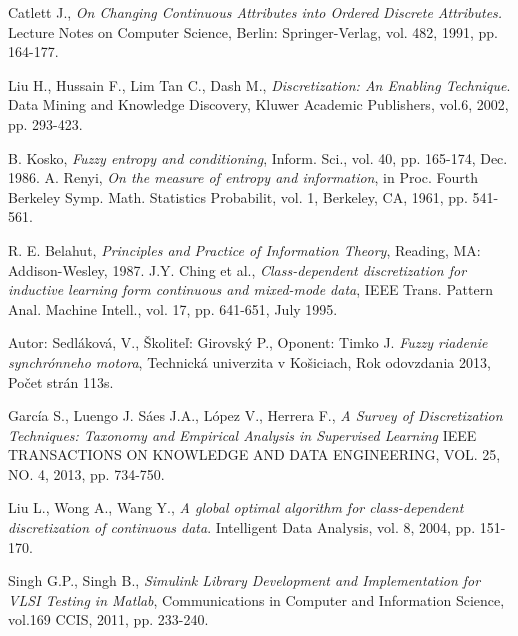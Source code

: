 \begin{thebibliography}{}
 Catlett J., \textit{On Changing Continuous Attributes into Ordered Discrete Attributes.} Lecture Notes on Computer Science, Berlin: Springer-Verlag, vol. 482, 1991, pp. 164-177.  

 Liu H., Hussain F., Lim Tan C., Dash M., \textit{Discretization: An Enabling Technique}. Data Mining and Knowledge Discovery, Kluwer Academic Publishers, vol.6, 2002, pp. 293-423. 



 B. Kosko, \textit{Fuzzy entropy and conditioning}, Inform. Sci., vol. 40, pp. 165-174, Dec. 1986. 
 A. Renyi, \textit{On the measure of entropy and information}, in Proc. Fourth Berkeley Symp. Math. Statistics Probabilit, vol. 1, Berkeley, CA, 1961, pp. 541-561. 

 R. E. Belahut, \textit{Principles and Practice of Information Theory}, Reading, MA: Addison-Wesley, 1987. 
 J.Y. Ching et al., \textit{Class-dependent discretization for inductive learning form continuous and mixed-mode data}, IEEE Trans. Pattern Anal. Machine Intell., vol. 17, pp. 641-651, July 1995.  


 Autor: Sedláková, V., Školiteľ: Girovský P., Oponent: Timko J. \textit{Fuzzy riadenie synchrónneho motora}, Technická univerzita v Košiciach, Rok odovzdania 2013, Počet strán 113s. 



 García S., Luengo J. Sáes J.A., López V., Herrera F., \textit{ A Survey of Discretization Techniques: 	Taxonomy and Empirical Analysis	in Supervised Learning }
IEEE TRANSACTIONS ON KNOWLEDGE AND DATA ENGINEERING, VOL. 25, NO. 4, 2013, pp. 734-750.

 Liu L., Wong A., Wang Y., \textit{A global optimal algorithm for class-dependent discretization of continuous data}. Intelligent Data Analysis, vol. 8, 2004, pp. 151-170. 

 Singh G.P., Singh B., \textit{Simulink Library Development and Implementation for VLSI Testing in Matlab}, Communications in Computer and Information Science, vol.169 CCIS, 2011, pp. 233-240. 


\end{thebibliography}

